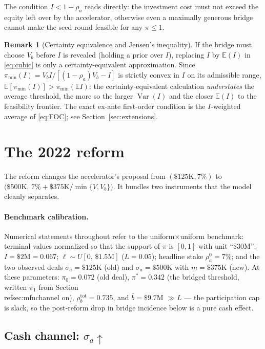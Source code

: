 \documentclass[11pt]{article}
\theoremstyle{definition}
\newtheorem{remark}{Remark}
\newcommand{\E}{\mathbb{E}}
\newcommand{\pimin}{\pi_{\min}}
\begin{document}
The condition $I < 1-\rho_a$ reads directly: the investment cost must not exceed the equity left over by the accelerator, otherwise even a maximally generous bridge cannot make the seed round feasible for any $\pi \le 1$.

\begin{remark}[Certainty equivalence and Jensen's inequality]\label{rem:jensen}
If the bridge must choose $V_b$ before $I$ is revealed (holding a prior over $I$), replacing $I$ by $\E(I)$ in \eqref{eq:cubic} is only a certainty-equivalent approximation. Since $\pimin(I) = V_b I/[(1-\rho_a)V_b - I]$ is strictly convex in $I$ on its admissible range, $\E[\pimin(I)] > \pimin(\E I)$: the certainty-equivalent calculation \emph{understates} the average threshold, the more so the larger $\operatorname{Var}(I)$ and the closer $\E(I)$ to the feasibility frontier. The exact ex-ante first-order condition is the $I$-weighted average of \eqref{eq:FOC}; see Section~\ref{sec:extensions}.
\end{remark}

\section{The 2022 reform}\label{sec:reform}

The reform changes the accelerator's proposal from $(\$125\text{K}, 7\%)$ to $\bigl(\$500\text{K},\, 7\% + \$375\text{K}/\min\{V, V_b\}\bigr)$. It bundles two instruments that the model cleanly separates.

\paragraph{Benchmark calibration.} Numerical statements throughout refer to the uniform$\times$uniform benchmark: terminal values normalized so that the support of $\pi$ is $[0,1]$ with unit ``\$30M''; $I=\$2\text{M}=0.067$; $\ell\sim U[0,\,\$1.5\text{M}]$ ($L=0.05$); headline stake $\rho_a^{0}=7\%$; and the two observed deals $\sigma_a=\$125$K (old) and $\sigma_a=\$500$K with $m=\$375$K (new). At these parameters: $\pi_0=0.072$ (old deal), $\pi^{*}=0.342$ (the bridged threshold, written $\pi_1$ from Section~\\ref{sec:mfnchannel} on), $\rho_b^{\mathrm{tot}}=0.735$, and $\bar b=\$9.7$M $\gg L$ --- the participation cap is slack, so the post-reform drop in bridge incidence below is a pure cash effect.

\subsection{Cash channel: $\sigma_a \uparrow$}
\end{document}
